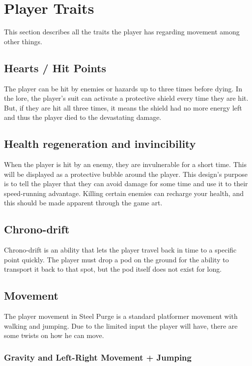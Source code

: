 \documentclass[../Main.tex]{subfiles}
\begin{document}
\section{Player Traits}

This section describes all the traits the player has regarding movement among other things.

\subsection{Hearts / Hit Points}

The player can be hit by enemies or hazards up to three times before dying. In the lore, the player's suit can activate a protective shield every time they are hit. But, if they are hit all three times, it means the shield had no more energy left and thus the player died to the devastating damage. 


\subsection{Health regeneration and invincibility}

When the player is hit by an enemy, they are invulnerable for a short time. This will be displayed as a protective bubble around the player. This design's purpose is to tell the player that they can avoid damage for some time and use it to their speed-running advantage. Killing certain enemies can recharge your health, and this should be made apparent through the game art. 

\subsection{Chrono-drift}

Chrono-drift is an ability that lets the player travel back in time to a specific point quickly. The player must drop a pod on the ground for the ability to transport it back to that spot, but the pod itself does not exist for long. 

\subsection{Movement}

The player movement in Steel Purge is a standard platformer movement with walking and jumping. Due to the limited input the player will have, there are some twists on how he can move.

\subsubsection{Gravity and Left-Right Movement + Jumping}
\end{document}
